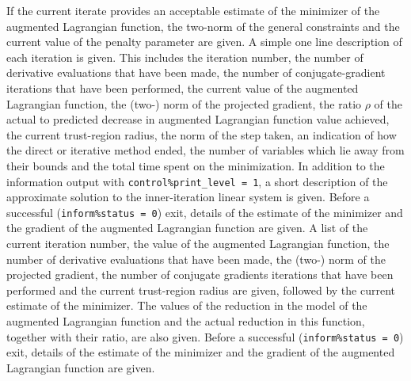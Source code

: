 \documentclass{galahad}
\begin{document}
\begin{description}
                 If the current iterate provides an acceptable
                 estimate of the minimizer of the augmented Lagrangian
                 function, the two-norm of the general constraints and
                 the current value of the penalty parameter are given.
 A simple one line description of each
                 iteration is
                 given. This includes the iteration number, the
                 number of derivative evaluations that have been
                 made, the number of conjugate-gradient iterations
                 that have been performed,
                 the current value of the augmented Lagrangian
                 function, the (two-) norm
                 of the projected gradient,
                 the ratio $\rho$ of the actual to predicted decrease
                 in augmented Lagrangian function value achieved,
                 the current trust-region radius,
                 the norm of the step taken,
                 an indication of how the direct or iterative
                 method ended, the number of variables which lie
                 away from their bounds and the total time
                 spent on the minimization.
 In addition to the information output with
                 {\tt control\%print\_level = 1},
                 a short description of the approximate solution
                 to the inner-iteration linear system is given.
                 Before a successful ({\tt inform\%status = 0}) exit, details of
                 the estimate of the minimizer and the
                 gradient of the augmented Lagrangian
                 function are given.
 A list of the current iteration number,
                 the value of the augmented Lagrangian function, the
                 number of derivative evaluations that have been
                 made, the (two-) norm
                 of the projected gradient,
                 the number of conjugate gradients
                 iterations that have been performed and the
                 current trust-region radius
                 are given, followed by the
                 current estimate of the minimizer.
                 The values of the reduction in the model of the
                 augmented Lagrangian function
                 and the actual reduction in this
                 function, together with their ratio, are also given.
                 Before a successful ({\tt inform\%status = 0}) exit, details of
                 the estimate of the minimizer and the
                 gradient of the augmented Lagrangian function are given.


\end{description}
\end{document}
